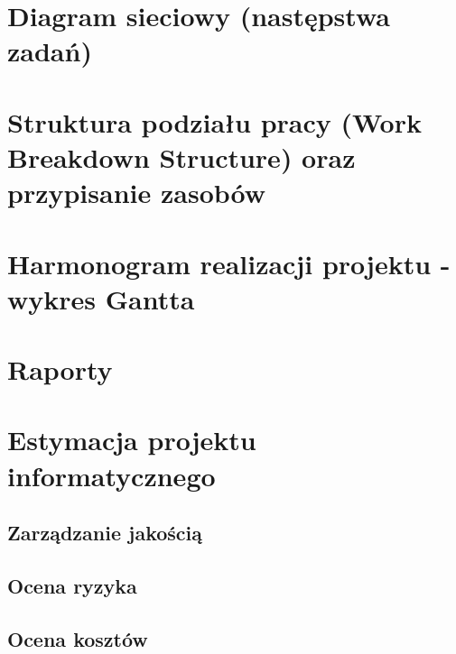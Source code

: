 \chapter{Diagram sieciowy (następstwa zadań)}
\chapter{Struktura podziału pracy (Work Breakdown Structure) oraz przypisanie zasobów}

\chapter{Harmonogram realizacji projektu -  wykres Gantta}
\chapter{Raporty}
\chapter{Estymacja projektu informatycznego}
\section{Zarządzanie jakością}
\section{Ocena ryzyka}
\section{Ocena kosztów}